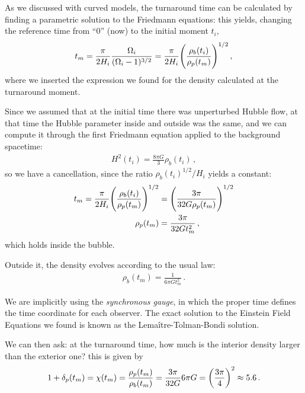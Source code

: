 \documentclass[main.tex]{subfiles}
\begin{document}
As we discussed with curved models, the turnaround time can be calculated by finding a parametric solution to the Friedmann equations: this yields, changing the reference time from ``0'' (now) to the initial moment \(t_i\),
%
\begin{align}
t_m = \frac{\pi }{2 H_i } \frac{\Omega_i }{(\Omega_i - 1)^{3/2}}
= \frac{\pi }{2 H_i} \qty(\frac{\rho_{b}(t_i)}{\rho_{p}(t_m)})^{1/2}
\,,
\end{align}
%
where we inserted the expression we found for the density calculated at the turnaround moment.


Since we assumed that at the initial time there was unperturbed Hubble flow, at that time the Hubble parameter inside and outside was the same, and we can compute it through the first Friedmann equation applied to the background spacetime:
%
\begin{align}
H^2(t_i) = \frac{8 \pi G}{3} \rho_{b}(t_i)
\,,
\end{align}
%
so we have a cancellation, since the ratio \(\rho _b (t_i)^{1/2} / H_i \) yields a constant:
%
\begin{align}
t_m = \frac{\pi }{2 H_i} \qty(\frac{\rho_{b}(t_i)}{\rho_{p}(t_m)})^{1/2} &= \qty(\frac{3 \pi }{32 G \rho_{p}(t_m)})^{1/2} \\
\rho_{p} (t_m) &= \frac{3 \pi }{32 G t_m^2}
\,,
\end{align}
%
which holds inside the bubble.

Outside it, the density evolves according to the usual law:
%
\begin{align}
\rho_{b}(t_m) = \frac{1}{6 \pi G t_m^2}
\,.
\end{align}

We are implicitly using the \emph{synchronous gauge}, in which the proper time defines the time coordinate for each observer.
The exact solution to the Einstein Field Equations we found is known as the Lemaître-Tolman-Bondi solution. 

We can then ask: at the turnaround time, how much is the interior density larger than the exterior one? this is given by 
%
\begin{align}
1 + \delta_{p}(t_m) = \chi (t_m) = \frac{\rho_{p}(t_m)}{\rho_{b}(t_m)} = \frac{3 \pi }{32 G } 6 \pi G = \qty(\frac{3 \pi }{4})^{2} \approx 5.6 
\,.
\end{align}
\end{document}
